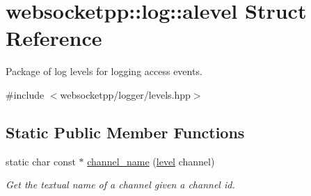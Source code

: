 \hypertarget{structwebsocketpp_1_1log_1_1alevel}{}\section{websocketpp\+:\+:log\+:\+:alevel Struct Reference}
\label{structwebsocketpp_1_1log_1_1alevel}


Package of log levels for logging access events.  




{\ttfamily \#include $<$websocketpp/logger/levels.\+hpp$>$}

\subsection*{Static Public Member Functions}
\begin{DoxyCompactItemize}
\item 
static char const $\ast$ \hyperlink{structwebsocketpp_1_1log_1_1alevel_a7145c18f40f74cff4946994c14634ce9}{channel\+\_\+name} (\hyperlink{namespacewebsocketpp_1_1log_a12d4d17939f102db8c9183d400a41960}{level} channel)
\begin{DoxyCompactList}\small\item\em Get the textual name of a channel given a channel id. \end{DoxyCompactList}\end{DoxyCompactItemize}
